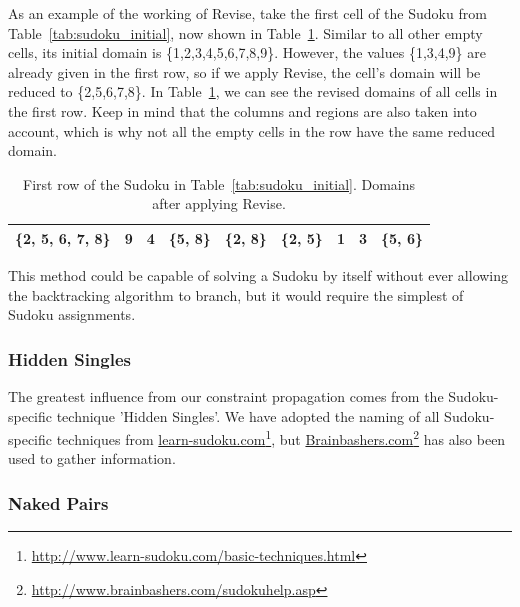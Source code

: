 \documentclass[11pt]{article} %
\begin{document}
As an example of the working of Revise, take the first cell of the Sudoku from Table~\ref{tab:sudoku_initial}, now shown in Table~\ref{tab:sudoku_frstrow_rev}. Similar to all other empty cells, its initial domain is \{1,2,3,4,5,6,7,8,9\}.
However, the values \{1,3,4,9\} are already given in the first row, so if we apply Revise, the cell's domain will be reduced to \{2,5,6,7,8\}.
In Table~\ref{tab:sudoku_frstrow_rev}, we can see the revised domains of all cells in the first row. Keep in mind that the columns and regions are also taken into account, which is why not all the empty cells in the row have the same reduced domain.

\begin{table}[htbp]
\caption{First row of the Sudoku in Table~\ref{tab:sudoku_initial}. Domains after applying Revise.}
    \label{tab:sudoku_frstrow_rev}

    \begin{center}
        \begin{tabular}{||c|c|c||c|c|c||c|c|c||}
        \hline
        \hline
        \{2, 5, 6, 7, 8\} & 9 & 4 & \{5, 8\} & \{2, 8\} & \{2, 5\} & 1 & 3 & \{5, 6\}\\
        \hline
        \end{tabular}
    \end{center}
\end{table}

This method could be capable of solving a Sudoku by itself without ever allowing the backtracking algorithm to branch, but it would require the simplest of Sudoku assignments.

\subsubsection{Hidden Singles}

The greatest influence from our constraint propagation comes from the Sudoku-specific technique 'Hidden Singles'. We have adopted the naming of all Sudoku-specific techniques from \url{learn-sudoku.com}\footnote{\url{http://www.learn-sudoku.com/basic-techniques.html}}, but \url{Brainbashers.com}\footnote{\url{http://www.brainbashers.com/sudokuhelp.asp}} has also been used to gather information.

\subsubsection{Naked Pairs}
\end{document}
